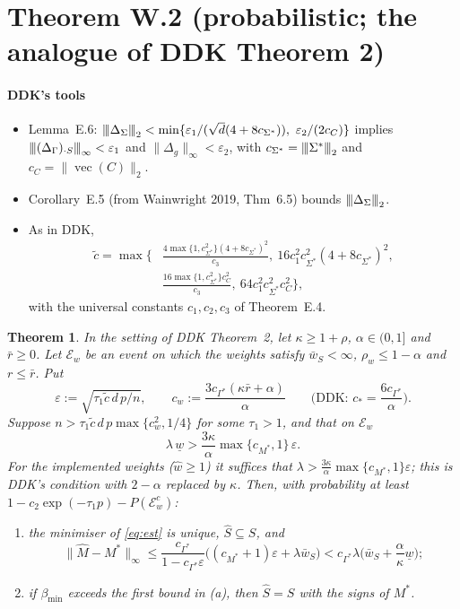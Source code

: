 \documentclass[11pt,a4paper]{article}
\numberwithin{equation}{section}
\theoremstyle{plain}
\newtheorem{theorem}{Theorem}
\theoremstyle{remark}
\newcommand{\opnorm}[1]{{\vert\kern-0.25ex\vert\kern-0.25ex\vert #1 \vert\kern-0.25ex\vert\kern-0.25ex\vert}}
\DeclareMathOperator{\vect}{vec}
\begin{document}
\section{Theorem W.2 (probabilistic; the analogue of DDK Theorem 2)}\label{sec:W2}

\paragraph{DDK's tools}
\begin{itemize}
  \item Lemma~E.6: $\opnorm{\Delta_\Sigma}_2<\min\{\varepsilon_1/(\sqrt d(4+8c_{\Sigma^*})),\ \varepsilon_2/(2c_C)\}$ implies $\opnorm{(\Delta_\Gamma)_{\cdot S}}_\infty<\varepsilon_1$ and $\|\Delta_g\|_\infty<\varepsilon_2$, with $c_{\Sigma^*}=\opnorm{\Sigma^*}_2$ and $c_C=\|\vect(C)\|_2$.
  \item Corollary~E.5 (from Wainwright 2019, Thm~6.5) bounds $\opnorm{\Delta_\Sigma}_2$.
  \item As in DDK,
  \[
  \begin{split}
  \tilde c=\max\Big\{&\frac{4\max\{1,c_{\Sigma^*}^2\}(4+8c_{\Sigma^*})^2}{c_3},\ 16c_1^2c_{\Sigma^*}^2(4+8c_{\Sigma^*})^2,\\
  &\frac{16\max\{1,c_{\Sigma^*}^2\}c_C^2}{c_3},\ 64c_1^2c_{\Sigma^*}^2c_C^2\Big\},
  \end{split}
  \]
  with the universal constants $c_1,c_2,c_3$ of Theorem~E.4.
\end{itemize}

\begin{theorem}\label{thm:W2}
In the setting of DDK Theorem~2, let $\kappa\ge1+\rho$, $\alpha\in(0,1]$ and $\bar r\ge0$. Let $\mathcal E_w$ be an event on which the weights satisfy $\bar w_S<\infty$, $\rho_w\le1-\alpha$ and $r\le\bar r$. Put
\[
\varepsilon:=\sqrt{\tau_1\tilde c\,d\,p/n},\qquad c_w:=\frac{3c_{\Gamma^*}(\kappa\bar r+\alpha)}{\alpha}\qquad\Big(\text{DDK: }c_*=\frac{6c_{\Gamma^*}}{\alpha}\Big).
\]
Suppose $n>\tau_1\tilde c\,d\,p\max\{c_w^2,1/4\}$ for some $\tau_1>1$, and that on $\mathcal E_w$
\[
\lambda\,\underline w>\frac{3\kappa}{\alpha}\max\{c_{M^*},1\}\,\varepsilon .
\]
For the implemented weights ($\hat w\ge1$) it suffices that $\lambda>\frac{3\kappa}{\alpha}\max\{c_{M^*},1\}\varepsilon$; this is DDK's condition with $2-\alpha$ replaced by $\kappa$. Then, with probability at least $1-c_2\exp(-\tau_1p)-P(\mathcal E_w^c)$:
\begin{enumerate}[label=\upshape(\alph*)]
  \item the minimiser of \eqref{eq:est} is unique, $\hat S\subseteq S$, and
  \[
  \|\hat M-M^*\|_\infty\le\frac{c_{\Gamma^*}}{1-c_{\Gamma^*}\varepsilon}\big((c_{M^*}+1)\varepsilon+\lambda\bar w_S\big)<c_{\Gamma^*}\lambda\Big(\bar w_S+\frac\alpha\kappa\underline w\Big);
  \]
  \item if $\beta_{\min}$ exceeds the first bound in (a), then $\hat S=S$ with the signs of $M^*$.
\end{enumerate}
\end{theorem}
\end{document}
